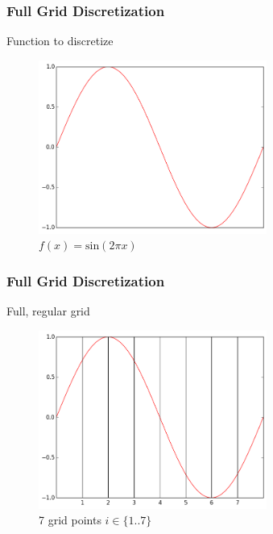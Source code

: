 \begin{frame}
  \frametitle{Full Grid Discretization}
  \topline
  \vspace{-10px}
  \begin{block}{Function to discretize}
    \begin{figure}[!htp]

      \centering
      \includegraphics[width=7.5cm]{images/singlebasis_1}
      \vspace{-12px}
      \caption{$f(x) =\text{sin}(2\pi x)$}
    \end{figure}
  \end{block}
\end{frame}

\begin{frame}
  \frametitle{Full Grid Discretization}
  \topline
  \vspace{-10px}
  \begin{block}{Full, regular grid}
    \begin{figure}[!htp]

      \centering
      \includegraphics[width=7.5cm]{images/singlebasis_2}
      \vspace{-12px}
      \caption{7 grid points $i \in \{1..7\}$}
    \end{figure}
  \end{block}
\end{frame}

